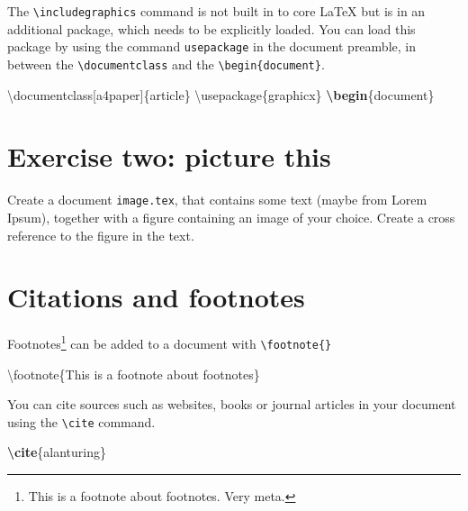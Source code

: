 \documentclass[
]{book}
\newenvironment{Shaded}{\begin{snugshade}}{\end{snugshade}}
\newcommand{\BuiltInTok}[1]{#1}
\newcommand{\ExtensionTok}[1]{#1}
\newcommand{\FunctionTok}[1]{\textcolor[rgb]{0.00,0.00,0.00}{#1}}
\newcommand{\KeywordTok}[1]{\textcolor[rgb]{0.13,0.29,0.53}{\textbf{#1}}}
\newcommand{\NormalTok}[1]{#1}
\begin{document}
The \texttt{\textbackslash{}includegraphics} command is not built in to core LaTeX but is in an additional package, which needs to be explicitly loaded. You can load this package by using the command \texttt{usepackage} in the document preamble, in between the \texttt{\textbackslash{}documentclass} and the \texttt{\textbackslash{}begin\{document\}}.

\begin{Shaded}
\begin{Highlighting}[]
\BuiltInTok{\textbackslash{}documentclass}\NormalTok{[a4paper]\{}\ExtensionTok{article}\NormalTok{\}}
\BuiltInTok{\textbackslash{}usepackage}\NormalTok{\{}\ExtensionTok{graphicx}\NormalTok{\}}
\KeywordTok{\textbackslash{}begin}\NormalTok{\{}\ExtensionTok{document}\NormalTok{\}}
\end{Highlighting}
\end{Shaded}

\hypertarget{ex2}{%
\section{Exercise two: picture this}\label{ex2}}

Create a document \texttt{image.tex}, that contains some text (maybe from Lorem Ipsum), together with a figure containing an image of your choice. Create a cross reference to the figure in the text.

\hypertarget{citations-and-footnotes}{%
\section{Citations and footnotes}\label{citations-and-footnotes}}

Footnotes\footnote{This is a footnote about footnotes. Very meta.} can be added to a document with \texttt{\textbackslash{}footnote\{\}}

\begin{Shaded}
\begin{Highlighting}[]
\FunctionTok{\textbackslash{}footnote}\NormalTok{\{This is a footnote about footnotes\}}
\end{Highlighting}
\end{Shaded}

You can cite sources such as websites, books or journal articles in your document using the \texttt{\textbackslash{}cite} command.

\begin{Shaded}
\begin{Highlighting}[]
\KeywordTok{\textbackslash{}cite}\NormalTok{\{}\ExtensionTok{alanturing}\NormalTok{\}}
\end{Highlighting}
\end{Shaded}
\end{document}
